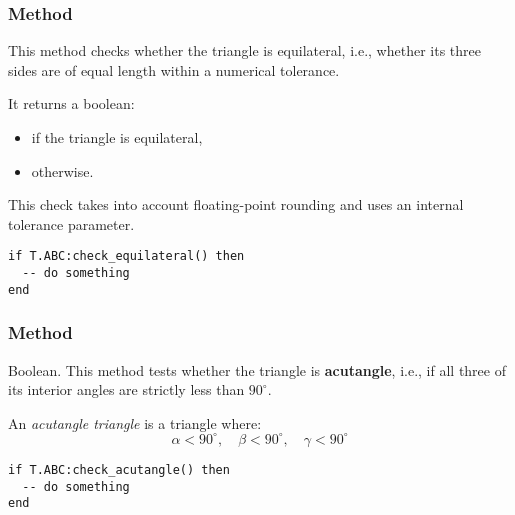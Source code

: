 
\subsubsection{Method } %
\label{ssub:_triangle_check__equilateral}

This method checks whether the triangle is equilateral, i.e., whether its three sides are of equal length within a numerical tolerance.

\medskip
\noindent
It returns a boolean:
\begin{itemize}
  \item {} if the triangle is equilateral,
  \item {} otherwise.
\end{itemize}

\noindent
This check takes into account floating-point rounding and uses an internal tolerance parameter.


\begin{mybox}
\begin{verbatim}
if T.ABC:check_equilateral() then
  -- do something
end
\end{verbatim}
\end{mybox}

\vspace{1em}



\subsubsection{Method } %
\label{ssub:_triangle_check__acutangle}

Boolean. This method tests whether the triangle is \textbf{acutangle}, i.e., if all three of its interior angles are strictly less than $90^\circ$.

\medskip
\noindent
An \emph{acutangle triangle} is a triangle where:
\[
\alpha < 90^\circ, \quad \beta < 90^\circ, \quad \gamma < 90^\circ
\]


\begin{mybox}
\begin{verbatim}
if T.ABC:check_acutangle() then
  -- do something
end
\end{verbatim}
\end{mybox}


